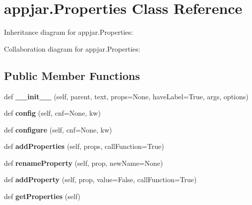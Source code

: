 \hypertarget{classappjar_1_1_properties}{}\section{appjar.\+Properties Class Reference}
\label{classappjar_1_1_properties}


Inheritance diagram for appjar.\+Properties\+:


Collaboration diagram for appjar.\+Properties\+:
\subsection*{Public Member Functions}
\begin{DoxyCompactItemize}
\item 
\mbox{\label{classappjar_1_1_properties_a627862bce792d6381f1c2a2937fa7b08}} 
def {\bfseries \+\_\+\+\_\+init\+\_\+\+\_\+} (self, parent, text, props=None, have\+Label=True, args, options)
\item 
\mbox{\label{classappjar_1_1_properties_a97b04d74cb62a32fe331e78954f7180c}} 
def {\bfseries config} (self, cnf=None, kw)
\item 
\mbox{\label{classappjar_1_1_properties_ae12e0c1ab8682e00aa010ead03d07ce0}} 
def {\bfseries configure} (self, cnf=None, kw)
\item 
\mbox{\label{classappjar_1_1_properties_a05e0c742e3e81f78f3c70db2de4e4654}} 
def {\bfseries add\+Properties} (self, props, call\+Function=True)
\item 
\mbox{\label{classappjar_1_1_properties_a0f2ff90edce9b127c018952833567f7f}} 
def {\bfseries rename\+Property} (self, prop, new\+Name=None)
\item 
\mbox{\label{classappjar_1_1_properties_a8bd30ae02e6a3b906eb2c59b58e4dcb3}} 
def {\bfseries add\+Property} (self, prop, value=False, call\+Function=True)
\item 
\mbox{\label{classappjar_1_1_properties_ac36a8383ea738d83bd98ff98576794ec}} 
def {\bfseries get\+Properties} (self)

\end{DoxyCompactItemize}
